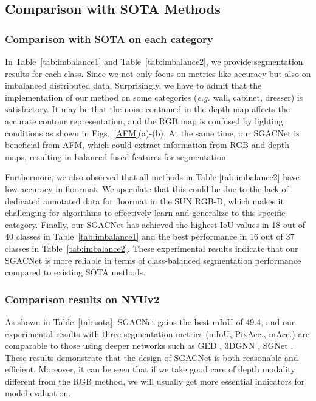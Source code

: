 \documentclass[journal,twoside,web]{ieeecolor}
\begin{document}
\subsection{Comparison with SOTA Methods}
\subsubsection{Comparison with SOTA on each category}
In Table~\ref{tab:imbalance1} and Table~\ref{tab:imbalance2}, we provide segmentation results for each class. Since we not only focus on metrics like accuracy but also on imbalanced distributed data. Surprisingly, we have to admit that the implementation of our method on some categories (\textit{e.g.} wall, cabinet, dresser) is satisfactory. It may be that the noise contained in the depth map affects the accurate contour representation, and the RGB map is confused by lighting conditions as shown in Figs.~\ref{AFM}(a)-(b). At the same time, our SGACNet is beneficial from AFM, which could extract information from RGB and depth maps, resulting in balanced fused features for segmentation. 

Furthermore, we also observed that all methods in Table \ref{tab:imbalance2} have low accuracy in floormat. We speculate that this could be due to the lack of dedicated annotated data for floormat in the SUN RGB-D, which makes it challenging for algorithms to effectively learn and generalize to this specific category. Finally, our SGACNet has achieved the highest IoU values in 18 out of 40 classes in Table~\ref{tab:imbalance1} and the best performance in 16 out of 37 classes in Table~\ref{tab:imbalance2}. These experimental results indicate that our SGACNet is more reliable in terms of class-balanced segmentation performance compared to existing SOTA methods.

\subsubsection{Comparison results on NYUv2}
As shown in Table~\ref{tab:sota}, SGACNet gains the best mIoU of 49.4, and our experimental results with three segmentation metrics (mIoU, PixAcc., mAcc.) are comparable to those using deeper networks such as GED \cite{GED}, 3DGNN \cite{3DGNN}, SGNet \cite{SGNet}. These results demonstrate that the design of SGACNet is both reasonable and efficient. Moreover, it can be seen that if we take good care of depth modality different from the RGB method, we will usually get more essential indicators for model evaluation. 
\end{document}
